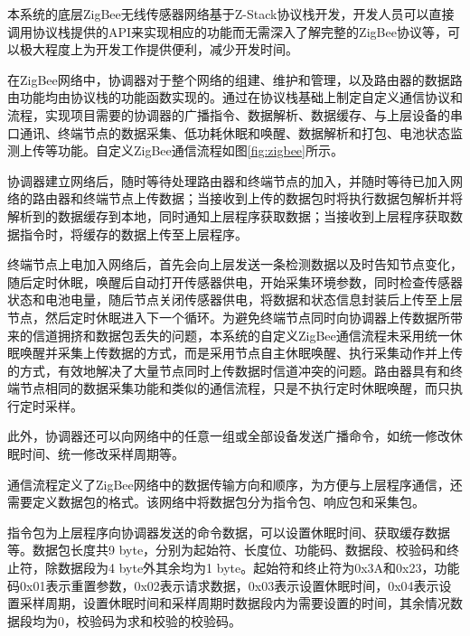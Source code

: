 本系统的底层ZigBee无线传感器网络基于Z-Stack协议栈开发，开发人员可以直接调用协议栈提供的API来实现相应的功能而无需深入了解完整的ZigBee协议等，可以极大程度上为开发工作提供便利，减少开发时间。

	\begin{figure}[!htbp]
		\centering
	\end{figure}
在ZigBee网络中，协调器对于整个网络的组建、维护和管理，以及路由器的数据路由功能均由协议栈的功能函数实现的。通过在协议栈基础上制定自定义通信协议和流程，实现项目需要的协调器的广播指令、数据解析、数据缓存、与上层设备的串口通讯、终端节点的数据采集、低功耗休眠和唤醒、数据解析和打包、电池状态监测上传等功能。自定义ZigBee通信流程如图\ref{fig:zigbee}所示。

协调器建立网络后，随时等待处理路由器和终端节点的加入，并随时等待已加入网络的路由器和终端节点上传数据；当接收到上传的数据包时将执行数据包解析并将解析到的数据缓存到本地，同时通知上层程序获取数据；当接收到上层程序获取数据指令时，将缓存的数据上传至上层程序。

终端节点上电加入网络后，首先会向上层发送一条检测数据以及时告知节点变化，随后定时休眠，唤醒后自动打开传感器供电，开始采集环境参数，同时检查传感器状态和电池电量，随后节点关闭传感器供电，将数据和状态信息封装后上传至上层节点，然后定时休眠进入下一个循环。为避免终端节点同时向协调器上传数据所带来的信道拥挤和数据包丢失的问题，本系统的自定义ZigBee通信流程未采用统一休眠唤醒并采集上传数据的方式，而是采用节点自主休眠唤醒、执行采集动作并上传的方式，有效地解决了大量节点同时上传数据时信道冲突的问题。路由器具有和终端节点相同的数据采集功能和类似的通信流程，只是不执行定时休眠唤醒，而只执行定时采样。

此外，协调器还可以向网络中的任意一组或全部设备发送广播命令，如统一修改休眠时间、统一修改采样周期等。

通信流程定义了ZigBee网络中的数据传输方向和顺序，为方便与上层程序通信，还需要定义数据包的格式。该网络中将数据包分为指令包、响应包和采集包。

指令包为上层程序向协调器发送的命令数据，可以设置休眠时间、获取缓存数据等。数据包长度共9 byte，分别为起始符、长度位、功能码、数据段、校验码和终止符，除数据段为4 byte外其余均为1 byte。起始符和终止符为0x3A和0x23，功能码0x01表示重置参数，0x02表示请求数据，0x03表示设置休眠时间，0x04表示设置采样周期，设置休眠时间和采样周期时数据段内为需要设置的时间，其余情况数据段均为0，校验码为求和校验的校验码。

